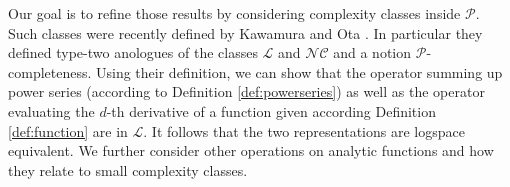 \documentclass{article}
\newcommand{\p}{\ensuremath{\mathcal P}\xspace}
\newcommand{\cl}{\ensuremath{\mathcal{L}}\xspace}
\newcommand{\nc}{\ensuremath{\mathcal{NC}}\xspace}
\begin{document}
Our goal is to refine those results by considering complexity classes inside \p.
Such classes were recently defined by Kawamura and Ota \cite{Kawamura2014}.
In particular they defined type-two anologues of the classes \cl and \nc and a notion \p-completeness.
Using their definition, we can show that the operator summing up power series (according to Definition \ref{def:powerseries}) as well as the operator evaluating the $d$-th derivative of a function given according Definition \ref{def:function} are in \cl.
It follows that the two representations are logspace equivalent.
We further consider other operations on analytic functions and how they relate to small complexity classes.

{}
\end{document}
